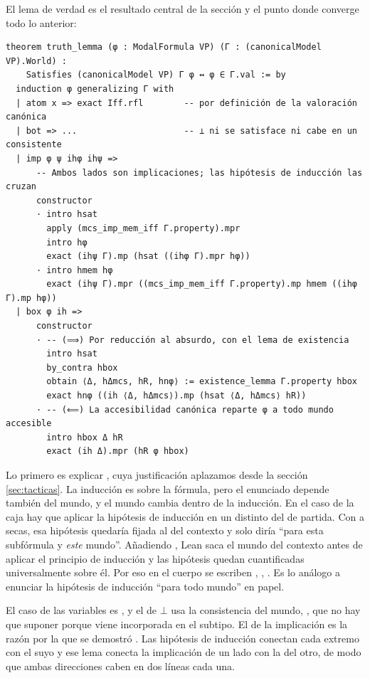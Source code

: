 El lema de verdad es el resultado central de la sección y el punto donde converge todo lo anterior:

\begin{lstlisting}
theorem truth_lemma (φ : ModalFormula VP) (Γ : (canonicalModel VP).World) :
    Satisfies (canonicalModel VP) Γ φ ↔ φ ∈ Γ.val := by
  induction φ generalizing Γ with
  | atom x => exact Iff.rfl        -- por definición de la valoración canónica
  | bot => ...                     -- ⊥ ni se satisface ni cabe en un consistente
  | imp φ ψ ihφ ihψ =>
      -- Ambos lados son implicaciones; las hipótesis de inducción las cruzan
      constructor
      · intro hsat
        apply (mcs_imp_mem_iff Γ.property).mpr
        intro hφ
        exact (ihψ Γ).mp (hsat ((ihφ Γ).mpr hφ))
      · intro hmem hφ
        exact (ihψ Γ).mpr ((mcs_imp_mem_iff Γ.property).mp hmem ((ihφ Γ).mp hφ))
  | box φ ih =>
      constructor
      · -- (⟹) Por reducción al absurdo, con el lema de existencia
        intro hsat
        by_contra hbox
        obtain ⟨Δ, hΔmcs, hR, hnφ⟩ := existence_lemma Γ.property hbox
        exact hnφ ((ih ⟨Δ, hΔmcs⟩).mp (hsat ⟨Δ, hΔmcs⟩ hR))
      · -- (⟸) La accesibilidad canónica reparte φ a todo mundo accesible
        intro hbox Δ hR
        exact (ih Δ).mpr (hR φ hbox)
\end{lstlisting}

Lo primero es explicar , cuya justificación aplazamos desde la sección \ref{sec:tacticas}. La inducción es sobre la fórmula, pero el enunciado depende también del mundo, y el mundo cambia dentro de la inducción. En el caso de la caja hay que aplicar la hipótesis de inducción en un  distinto del  de partida. Con  a secas, esa hipótesis quedaría fijada al  del contexto y solo diría ``para esta subfórmula y \emph{este} mundo''. Añadiendo , Lean saca el mundo del contexto antes de aplicar el principio de inducción y las hipótesis quedan cuantificadas universalmente sobre él. Por eso en el cuerpo se escriben , , . Es lo análogo a enunciar la hipótesis de inducción ``para todo mundo'' en papel.

El caso de las variables es , y el de $\bot$ usa la consistencia del mundo, , que no hay que suponer porque viene incorporada en el subtipo. El de la implicación es la razón por la que se demostró . Las hipótesis de inducción conectan cada extremo con el suyo y ese lema conecta la implicación de un lado con la del otro, de modo que ambas direcciones caben en dos líneas cada una.

